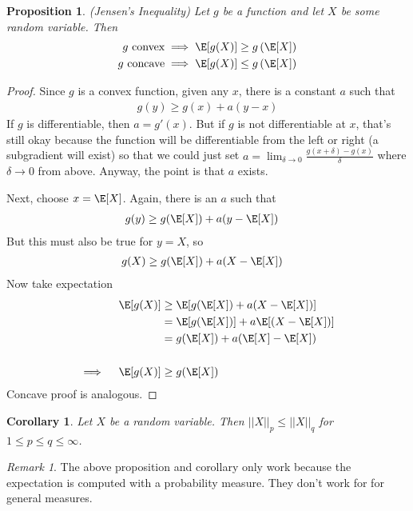 \documentclass[12pt]{article}
\theoremstyle{plain}
\newtheorem{prop}[thm]{Proposition}
\newtheorem{cor}[thm]{Corollary}
\theoremstyle{definition}
\theoremstyle{remark}
\newtheorem*{rmk}{Remark}
\newcommand{\ra}{\rightarrow}
\begin{document}
\begin{prop}{\emph{(Jensen's Inequality)}}
Let $g$ be a function and let $X$ be some random variable. Then
\begin{align*}
  \text{$g$ convex} &\implies \E[g(X)] \geq g\left(\E[X]\right) \\
  \text{$g$ concave} &\implies \E[g(X)] \leq g\left(\E[X]\right) \\
\end{align*}
\end{prop}
\begin{proof}
Since $g$ is a convex function, given any $x$, there is a constant $a$
such that
\begin{align*}
  g(y) \geq g(x) + a (y-x)
\end{align*}
If $g$ is differentiable, then $a=g'(x)$. But if $g$ is not
differentiable at $x$, that's still okay because the function will be
differentiable from the left or right (a subgradient will exist) so that
we could just set
$a=\lim_{\delta \ra 0} \frac{g(x+\delta)-g(x)}{\delta}$ where
$\delta\ra 0$ from above. Anyway, the point is that $a$ exists.

Next, choose $x=\E[X]$. Again, there is an $a$ such that
\begin{align*}
  g(y) &\geq g(\E[X]) + a (y-\E[X])
\end{align*}
But this must also be true for $y=X$, so
\begin{align*}
  g(X) &\geq g(\E[X]) + a (X-\E[X])
\end{align*}
Now take expectation
\begin{align*}
  \E[g(X)]
  &\geq \E[g(\E[X]) + a (X-\E[X])] \\
  &= \E[g(\E[X])] + a \E[(X-\E[X])] \\
  &= g(\E[X]) + a (\E[X]-\E[X]) \\\\
  \implies \quad
  \E[g(X)] &\geq g(\E[X])
\end{align*}
Concave proof is analogous.
\end{proof}

\begin{cor}
Let $X$ be a random variable. Then $||X||_p\leq ||X||_q$ for
$1\leq p\leq q\leq \infty$.
\end{cor}

\begin{rmk}
The above proposition and corollary only work because the expectation is
computed with a probability measure. They don't work for for general
measures.
\end{rmk}
\end{document}
